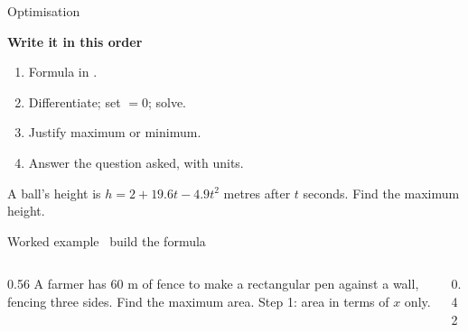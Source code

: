 \documentclass[aspectratio=169,11pt,t,xcolor=table]{beamer}
\newlength\figunit
\begin{document}
\begin{frame}{Optimisation}\relax
{\sEmph\bfseries Write it in this order\par}\vskip1mm
\begin{enumerate}
\item Formula in .
\item Differentiate; set $=0$; solve.
\item Justify maximum or minimum.
\item Answer the question asked, with units.
\end{enumerate}
\vskip3mm
 A ball's height is $h=2+19.6t-4.9t^{2}$ metres after $t$ seconds. Find the maximum height.
\end{frame}

\begin{frame}{Worked example \textperiodcentered\ build the formula}\relax
\begin{columns}[T]
\begin{column}{0.56\textwidth}
 A farmer has $60$ m of fence to make a rectangular pen against a wall, fencing three sides. Find the maximum area.
\vskip3mm
Step 1: area in terms of $x$ only.
\end{column}
\begin{column}{0.42\textwidth}\centering\vskip2mm
\setlength\figunit{11mm}

\end{column}
\end{columns}
\end{frame}
\end{document}
